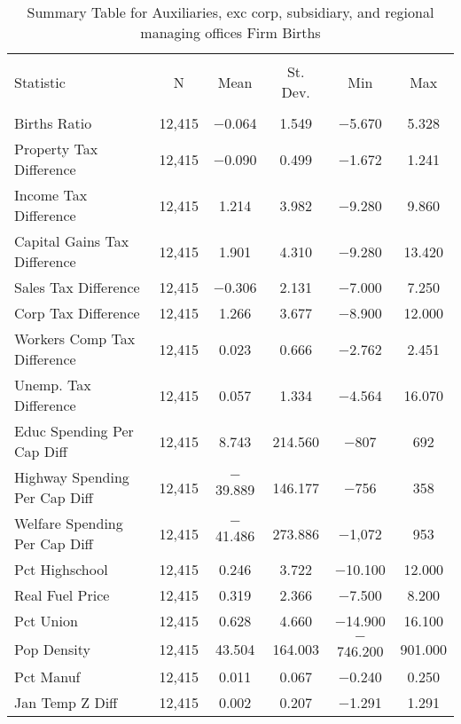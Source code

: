
\begin{table}[!htbp] \centering 
  \caption{Summary Table for  Auxiliaries, exc corp, subsidiary, and regional managing offices Firm Births} 
  \label{95summary} 
\begin{tabular}{@{\extracolsep{5pt}}lccccc} 
\\[-1.8ex]\hline 
\hline \\[-1.8ex] 
Statistic & \multicolumn{1}{c}{N} & \multicolumn{1}{c}{Mean} & \multicolumn{1}{c}{St. Dev.} & \multicolumn{1}{c}{Min} & \multicolumn{1}{c}{Max} \\ 
\hline \\[-1.8ex] 
Births Ratio & 12,415 & $-$0.064 & 1.549 & $-$5.670 & 5.328 \\ 
Property Tax Difference & 12,415 & $-$0.090 & 0.499 & $-$1.672 & 1.241 \\ 
Income Tax Difference & 12,415 & 1.214 & 3.982 & $-$9.280 & 9.860 \\ 
Capital Gains Tax Difference & 12,415 & 1.901 & 4.310 & $-$9.280 & 13.420 \\ 
Sales Tax Difference & 12,415 & $-$0.306 & 2.131 & $-$7.000 & 7.250 \\ 
Corp Tax Difference & 12,415 & 1.266 & 3.677 & $-$8.900 & 12.000 \\ 
Workers Comp Tax Difference & 12,415 & 0.023 & 0.666 & $-$2.762 & 2.451 \\ 
Unemp. Tax Difference & 12,415 & 0.057 & 1.334 & $-$4.564 & 16.070 \\ 
Educ Spending Per Cap Diff & 12,415 & 8.743 & 214.560 & $-$807 & 692 \\ 
Highway Spending Per Cap Diff & 12,415 & $-$39.889 & 146.177 & $-$756 & 358 \\ 
Welfare Spending Per Cap Diff & 12,415 & $-$41.486 & 273.886 & $-$1,072 & 953 \\ 
Pct Highschool & 12,415 & 0.246 & 3.722 & $-$10.100 & 12.000 \\ 
Real Fuel Price & 12,415 & 0.319 & 2.366 & $-$7.500 & 8.200 \\ 
Pct Union & 12,415 & 0.628 & 4.660 & $-$14.900 & 16.100 \\ 
Pop Density & 12,415 & 43.504 & 164.003 & $-$746.200 & 901.000 \\ 
Pct Manuf & 12,415 & 0.011 & 0.067 & $-$0.240 & 0.250 \\ 
Jan Temp Z Diff & 12,415 & 0.002 & 0.207 & $-$1.291 & 1.291 \\ 

\end{tabular}
\end{table}
